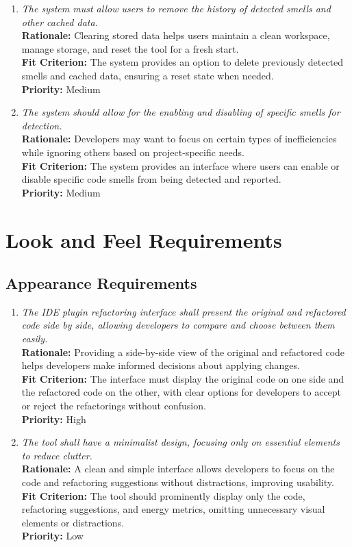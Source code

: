 \documentclass[12pt]{article}
\begin{document}
\begin{enumerate}[label=FR \arabic*., wide=0pt, leftmargin=*]
\item \emph{The system must allow users to remove the history of detected smells and other cached data.}\\[2mm]
    {\bf Rationale:} Clearing stored data helps users maintain a clean workspace, manage storage, and reset the tool for a fresh start.\\
    {\bf Fit Criterion:} The system provides an option to delete previously detected smells and cached data, ensuring a reset state when needed.\\
    {\bf Priority:} Medium

\item \emph{The system should allow for the enabling and disabling of specific smells for detection.}\\[2mm]
    {\bf Rationale:} Developers may want to focus on certain types of inefficiencies while ignoring others based on project-specific needs.\\
    {\bf Fit Criterion:} The system provides an interface where users can enable or disable specific code smells from being detected and reported.\\
    {\bf Priority:} Medium


\end{enumerate}

\section{Look and Feel Requirements}
\subsection{Appearance Requirements}
\begin{enumerate}[label=LFR-AP \arabic*., wide=0pt, leftmargin=*]
  \item \emph{The IDE plugin refactoring interface shall present the
      original and refactored code side by side, allowing developers to
    compare and choose between them easily.}\\[2mm]
    {\bf Rationale:} Providing a side-by-side view of the original
    and refactored code helps developers make informed decisions
    about applying changes.\\
    {\bf Fit Criterion:} The interface must display the original code
    on one side and the refactored code on the other, with clear
    options for developers to accept or reject the refactorings
    without confusion.\\
    {\bf Priority:} High
  \item \emph{The tool shall have a minimalist design, focusing only
    on essential elements to reduce clutter.}\\[2mm]
    {\bf Rationale:} A clean and simple interface allows developers
    to focus on the code and refactoring suggestions without
    distractions, improving usability.\\
    {\bf Fit Criterion:} The tool should prominently display only the
    code, refactoring suggestions, and energy metrics, omitting
    unnecessary visual elements or distractions.\\
    {\bf Priority:} Low
\end{enumerate}
\end{document}
